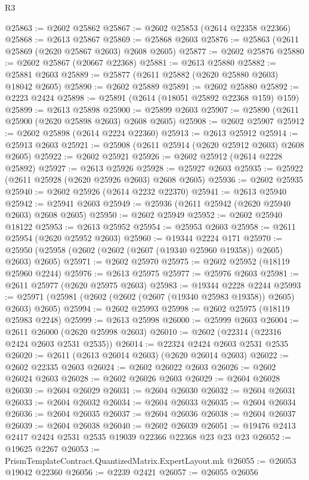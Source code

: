 \begin{lexlean}{R3}
\begin{coremodule}
@25863 := @2602 @25862
@25867 := @2602 @25853 (@2614 @22358 @22366)
@25868 := @2613 @25867
@25869 := @25868 @2603
@25876 := @25863 (@2611 @25869 (@2620 @25867 @2603) @2608 @2605)
@25877 := @2602 @25876
@25880 := @2602 @25867 (@20667 @22368)
@25881 := @2613 @25880
@25882 := @25881 @2603
@25889 := @25877 (@2611 @25882 (@2620 @25880 @2603) @18042 @2605)
@25890 := @2602 @25889
@25891 := @2602 @25880
@25892 := @2223 @2424
@25898 := @25891 (@2614 (@18051 @25892 @22368 @159) @159)
@25899 := @2613 @25898
@25900 := @25899 @2603
@25907 := @25890 (@2611 @25900 (@2620 @25898 @2603) @2608 @2605)
@25908 := @2602 @25907
@25912 := @2602 @25898 (@2614 @2224 @22360)
@25913 := @2613 @25912
@25914 := @25913 @2603
@25921 := @25908 (@2611 @25914 (@2620 @25912 @2603) @2608 @2605)
@25922 := @2602 @25921
@25926 := @2602 @25912 (@2614 @2228 @25892)
@25927 := @2613 @25926
@25928 := @25927 @2603
@25935 := @25922 (@2611 @25928 (@2620 @25926 @2603) @2608 @2605)
@25936 := @2602 @25935
@25940 := @2602 @25926 (@2614 @2232 @22370)
@25941 := @2613 @25940
@25942 := @25941 @2603
@25949 := @25936 (@2611 @25942 (@2620 @25940 @2603) @2608 @2605)
@25950 := @2602 @25949
@25952 := @2602 @25940 @18122
@25953 := @2613 @25952
@25954 := @25953 @2603
@25958 := @2611 @25954 (@2620 @25952 @2603)
@25960 := @19344 @2224 @171
@25970 := @25950 (@25958 (@2602 (@2602 (@2607 (@19340 @25960 @19358)) @2605) @2603) @2605)
@25971 := @2602 @25970
@25975 := @2602 @25952 (@18119 @25960 @2244)
@25976 := @2613 @25975
@25977 := @25976 @2603
@25981 := @2611 @25977 (@2620 @25975 @2603)
@25983 := @19344 @2228 @2244
@25993 := @25971 (@25981 (@2602 (@2602 (@2607 (@19340 @25983 @19358)) @2605) @2603) @2605)
@25994 := @2602 @25993
@25998 := @2602 @25975 (@18119 @25983 @2248)
@25999 := @2613 @25998
@26000 := @25999 @2603
@26004 := @2611 @26000 (@2620 @25998 @2603)
@26010 := @2602 (@22314 (@22316 @2424 @2603 @2531 @2535))
@26014 := @22324 @2424 @2603 @2531 @2535
@26020 := @2611 (@2613 @26014 @2603) (@2620 @26014 @2603)
@26022 := @2602 @22335 @2603
@26024 := @2602 @26022 @2603
@26026 := @2602 @26024 @2603
@26028 := @2602 @26026 @2603
@26029 := @2604 @26028
@26030 := @2604 @26029
@26031 := @2604 @26030
@26032 := @2604 @26031
@26033 := @2604 @26032
@26034 := @2604 @26033
@26035 := @2604 @26034
@26036 := @2604 @26035
@26037 := @2604 @26036
@26038 := @2604 @26037
@26039 := @2604 @26038
@26040 := @2602 @26039
@26051 := @19476 @2413 @2417 @2424 @2531 @2535 @19039 @22366 @22368 @23 @23 @23
@26052 := @19625 @2267
@26053 := PrismTemplateContract.QuantizedMatrix.ExpertLayout.mk
@26055 := @26053 @19042 @22360
@26056 := @2239 @2421
@26057 := @26055 @26056

\end{coremodule}
\end{lexlean}

